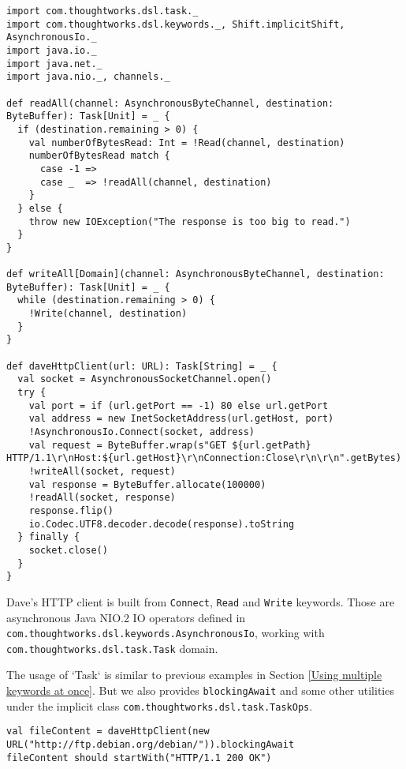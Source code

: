\begin{lstlisting}[caption={Dave's HTTP client},label={daveHttpClient}]
import com.thoughtworks.dsl.task._
import com.thoughtworks.dsl.keywords._, Shift.implicitShift, AsynchronousIo._
import java.io._
import java.net._
import java.nio._, channels._

def readAll(channel: AsynchronousByteChannel, destination: ByteBuffer): Task[Unit] = _ {
  if (destination.remaining > 0) {
    val numberOfBytesRead: Int = !Read(channel, destination)
    numberOfBytesRead match {
      case -1 =>
      case _  => !readAll(channel, destination)
    }
  } else {
    throw new IOException("The response is too big to read.")
  }
}

def writeAll[Domain](channel: AsynchronousByteChannel, destination: ByteBuffer): Task[Unit] = _ {
  while (destination.remaining > 0) {
    !Write(channel, destination)
  }
}

def daveHttpClient(url: URL): Task[String] = _ {
  val socket = AsynchronousSocketChannel.open()
  try {
    val port = if (url.getPort == -1) 80 else url.getPort
    val address = new InetSocketAddress(url.getHost, port)
    !AsynchronousIo.Connect(socket, address)
    val request = ByteBuffer.wrap(s"GET ${url.getPath} HTTP/1.1\r\nHost:${url.getHost}\r\nConnection:Close\r\n\r\n".getBytes)
    !writeAll(socket, request)
    val response = ByteBuffer.allocate(100000)
    !readAll(socket, response)
    response.flip()
    io.Codec.UTF8.decoder.decode(response).toString
  } finally {
    socket.close()
  }
}
\end{lstlisting}

Dave's HTTP client is built from \lstinline{Connect}, \lstinline{Read} and \lstinline{Write} keywords. Those are asynchronous Java NIO.2 IO operators defined in \lstinline{com.thoughtworks.dsl.keywords.AsynchronousIo}, working with \lstinline{com.thoughtworks.dsl.task.Task} domain.

The usage of `Task` is similar to previous examples in Section \ref{Using multiple keywords at once}. But we also provides \lstinline{blockingAwait} and some other utilities under the implicit class \lstinline{com.thoughtworks.dsl.task.TaskOps}.

\begin{lstlisting}[caption={Using Dave's http client},label={usingDaveHttpClient}]
val fileContent = daveHttpClient(new URL("http://ftp.debian.org/debian/")).blockingAwait
fileContent should startWith("HTTP/1.1 200 OK")
\end{lstlisting}


